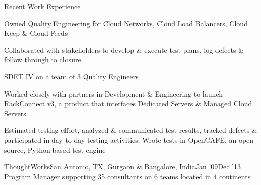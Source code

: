 \documentclass{resume} %
\begin{document}
\begin{rSection}{Recent Work Experience}
\begin{rSubsection}{}{}{}{}
\item Owned Quality Engineering for Cloud Networks, Cloud Load Balancers, Cloud Keep \& Cloud Feeds
\item Collaborated with stakeholders to develop \& execute test plans, log defects \& follow through to closure

\end{rSubsection}\vspace{-1em}






  \begin{rSubsection}{}{}{}{}
{SDET IV on a team of 3 Quality Engineers}

\item Worked closely with partners in Development \& Engineering to launch RackConnect v3, a product that interfaces Dedicated Servers \& Managed Cloud Servers
\item Estimated testing effort, analyzed \& communicated test results, tracked defects \& participated in day-to-day testing activities. Wrote tests in OpenCAFE, an open source, Python-based test engine

\end{rSubsection}





\begin{rSubsection}{ThoughtWorks}{San Antonio, TX, Gurgaon \& Bangalore, India}{Jan '09}{Dec '13}
    {Program Manager supporting 35 consultants on 6 teams located in 4 continents}


\end{rSubsection}
\end{rSection}
\end{document}
